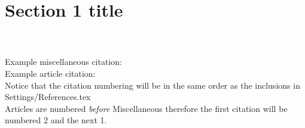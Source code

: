 \documentclass[../main.tex]{subfiles}
\begin{document}
\section{Section 1 title}

\blindtext\\

\blindtext\\

\noindent Example miscellaneous citation: \cite{Author}\\

\noindent Example article citation: \cite{einstein}\\

\noindent Notice that the citation numbering will be in the same
order as the inclusions in Settings/References.tex\\

\noindent Articles are numbered \emph{before} Miscellaneous therefore the
first citation will be numbered 2 and the next 1.
\end{document}
